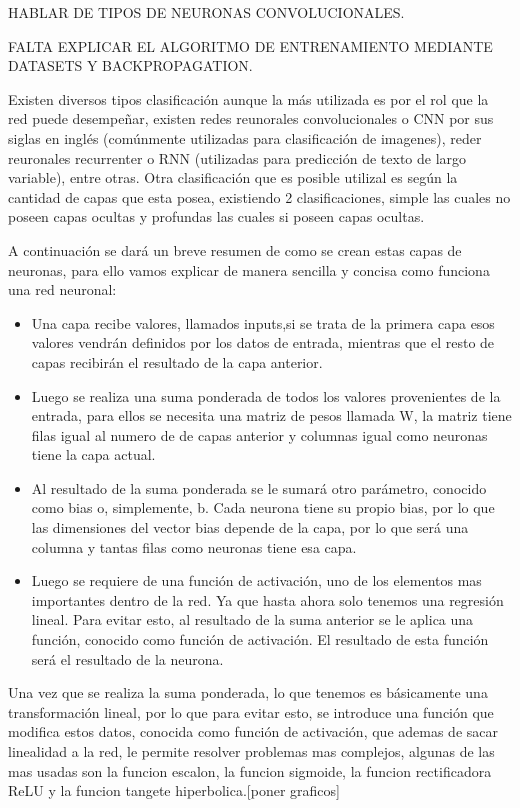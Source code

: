 HABLAR DE TIPOS DE NEURONAS CONVOLUCIONALES.

FALTA EXPLICAR EL ALGORITMO DE ENTRENAMIENTO MEDIANTE DATASETS Y BACKPROPAGATION.

Existen diversos tipos clasificación aunque la más utilizada es por el rol que la red puede desempeñar, existen redes reunorales convolucionales o CNN por sus siglas en inglés (comúnmente utilizadas para clasificación de imagenes),
reder reuronales recurrenter o RNN (utilizadas para predicción de texto de largo variable), entre otras. Otra clasificación que es posible utilizal es según la cantidad de capas que esta posea, existiendo 2 clasificaciones, simple las cuales no poseen capas ocultas y profundas las cuales si poseen capas ocultas.

A continuación se dará un breve resumen de como se crean estas capas de neuronas, para ello vamos explicar de manera sencilla y concisa como funciona una red neuronal:
\begin{itemize}
    \item Una capa recibe valores, llamados inputs,si se trata de la primera capa esos valores vendrán definidos por los datos de entrada, mientras que el resto de capas recibirán el resultado de la capa anterior.
    \item Luego se realiza una suma ponderada de todos los valores provenientes de la entrada, para ellos se necesita una matriz de pesos llamada W, la matriz tiene filas igual al numero de de capas anterior y columnas igual como neuronas tiene la capa actual.
    \item Al resultado de la suma ponderada se le sumará otro parámetro, conocido como bias o, simplemente, b. Cada neurona tiene su propio bias, por lo que las dimensiones del vector bias depende de la capa, por lo que será una columna y tantas filas como neuronas tiene esa capa.
    \item Luego se requiere de una función de activación, uno de los elementos mas importantes dentro de la red. Ya que hasta ahora solo tenemos una regresión lineal. Para evitar esto, al resultado de la suma anterior se le aplica una función, conocido como función de activación. El resultado de esta función será el resultado de la neurona.
\end{itemize}

Una vez que se realiza la suma ponderada, lo que tenemos es básicamente una transformación lineal, por lo que para evitar esto, se introduce una función que modifica estos datos, conocida como función de activación, que ademas de sacar linealidad a la red, le permite resolver problemas mas complejos, algunas de las mas usadas son la funcion escalon, la funcion sigmoide, la funcion rectificadora ReLU y la funcion tangete hiperbolica.[poner graficos]


